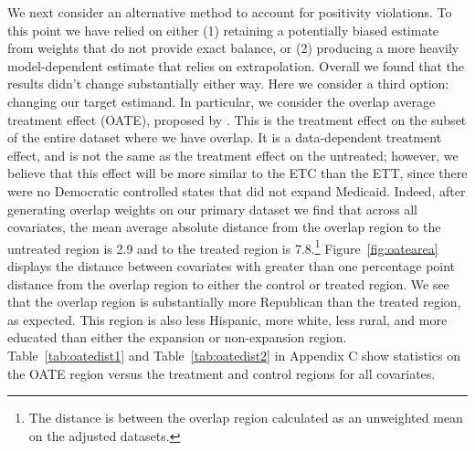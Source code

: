 \documentclass[12pt]{article}
\begin{document}
We next consider an alternative method to account for positivity violations. To this point we have relied on either (1) retaining a potentially biased estimate from weights that do not provide exact balance, or (2) producing a more heavily model-dependent estimate that relies on extrapolation. Overall we found that the results didn't change substantially either way. Here we consider a third option: changing our target estimand. In particular, we consider the overlap average treatment effect (OATE), proposed by \cite{li2018balancing}. This is the treatment effect on the subset of the entire dataset where we have overlap. It is a data-dependent treatment effect, and is not the same as the treatment effect on the untreated; however, we believe that this effect will be more similar to the ETC than the ETT, since there were no Democratic controlled states that did not expand Medicaid. Indeed, after generating overlap weights on our primary dataset we find that across all covariates, the mean average absolute distance from the overlap region to the untreated region is 2.9 and to the treated region is 7.8.\footnote{The distance is between the overlap region calculated as an unweighted mean on the adjusted datasets.} Figure~\ref{fig:oatearea} displays the distance between covariates with greater than one percentage point distance from the overlap region to either the control or treated region. We see that the overlap region is substantially more Republican than the treated region, as expected. This region is also less Hispanic, more white, less rural, and more educated than either the expansion or non-expansion region. Table~\ref{tab:oatedist1} and Table~\ref{tab:oatedist2} in Appendix C show statistics on the OATE region versus the treatment and control regions for all covariates.
\end{document}
